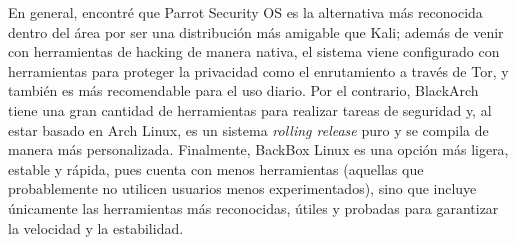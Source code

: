 En general, encontré que Parrot Security OS es la alternativa más reconocida dentro del área por ser una distribución más amigable que Kali; además de venir con herramientas de hacking de manera nativa, el sistema viene configurado con herramientas para proteger la privacidad como el enrutamiento a través de Tor, y también es más recomendable para el uso diario.
Por el contrario, BlackArch tiene una gran cantidad de herramientas para realizar tareas de seguridad y, al estar basado en Arch Linux, es un sistema \textit{rolling release} puro y se compila de manera más personalizada.
Finalmente, BackBox Linux es una opción más ligera, estable y rápida, pues cuenta con menos herramientas (aquellas que probablemente no utilicen usuarios menos experimentados), sino que incluye únicamente las herramientas más reconocidas, útiles y probadas para garantizar la velocidad y la estabilidad.
